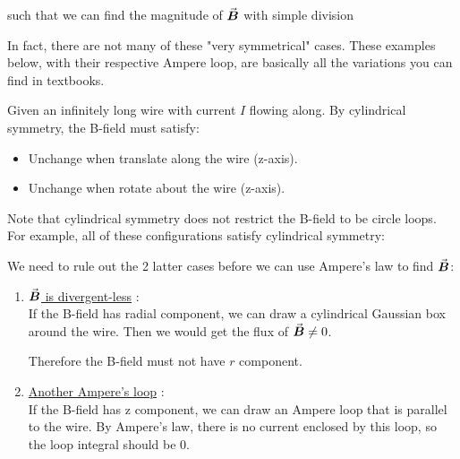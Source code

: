 \documentclass[class=article, crop=false, 12pt]{standalone}
\begin{document}
such that we can find the magnitude of $\va*{B}$ with simple division

In fact, there are not many of these "very symmetrical" cases.
These examples below, with their respective Ampere loop,
are basically all the variations you can find in textbooks.


\begin{example}
    Given an infinitely long wire with current $I$ flowing along.
    By cylindrical symmetry, the B-field must satisfy:
    \begin{itemize}
        \item Unchange when translate along the wire (z-axis).
        \item Unchange when rotate about the wire (z-axis).
    \end{itemize}
    
    Note that cylindrical symmetry does not restrict the B-field to be circle loops.
    For example, all of these configurations satisfy cylindrical symmetry:


    We need to rule out the 2 latter cases before we can use Ampere's law to find $\va*{B}$:

    \begin{enumerate}
        \item \ul{$\va*{B}$ is divergent-less} : \\
        If the B-field has radial component,
        we can draw a cylindrical Gaussian box around the wire.
        Then we would get the flux of $\va*{B} \neq 0$.


        Therefore the B-field must not have $r$ component.

        \item \ul{Another Ampere's loop} : \\
        If the B-field has z component, 
        we can draw an Ampere loop that is parallel to the wire.
        By Ampere's law, there is no current enclosed by this loop,
        so the loop integral should be $0$.



\end{enumerate}
\end{example}
\end{document}
